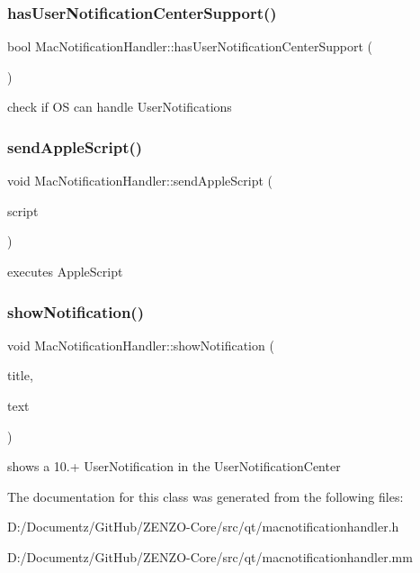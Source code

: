\subsubsection{\texorpdfstring{hasUserNotificationCenterSupport()}{hasUserNotificationCenterSupport()}}
{\footnotesize\ttfamily bool Mac\+Notification\+Handler\+::has\+User\+Notification\+Center\+Support (\begin{DoxyParamCaption}\item[{void}]{ }\end{DoxyParamCaption})}

check if OS can handle User\+Notifications \mbox{\label{class_mac_notification_handler_a39051c00850f7b6cb644cdb60006dc2e}} 
\subsubsection{\texorpdfstring{sendAppleScript()}{sendAppleScript()}}
{\footnotesize\ttfamily void Mac\+Notification\+Handler\+::send\+Apple\+Script (\begin{DoxyParamCaption}\item[{const Q\+String \&}]{script }\end{DoxyParamCaption})}

executes Apple\+Script \mbox{\label{class_mac_notification_handler_abeb9b3a7c81397499fbb7e1d24610cd9}} 
\subsubsection{\texorpdfstring{showNotification()}{showNotification()}}
{\footnotesize\ttfamily void Mac\+Notification\+Handler\+::show\+Notification (\begin{DoxyParamCaption}\item[{const Q\+String \&}]{title,  }\item[{const Q\+String \&}]{text }\end{DoxyParamCaption})}

shows a 10.+ User\+Notification in the User\+Notification\+Center 

The documentation for this class was generated from the following files\+:\begin{DoxyCompactItemize}
\item 
D\+:/\+Documentz/\+Git\+Hub/\+Z\+E\+N\+Z\+O-\/\+Core/src/qt/macnotificationhandler.\+h\item 
D\+:/\+Documentz/\+Git\+Hub/\+Z\+E\+N\+Z\+O-\/\+Core/src/qt/macnotificationhandler.\+mm\end{DoxyCompactItemize}
